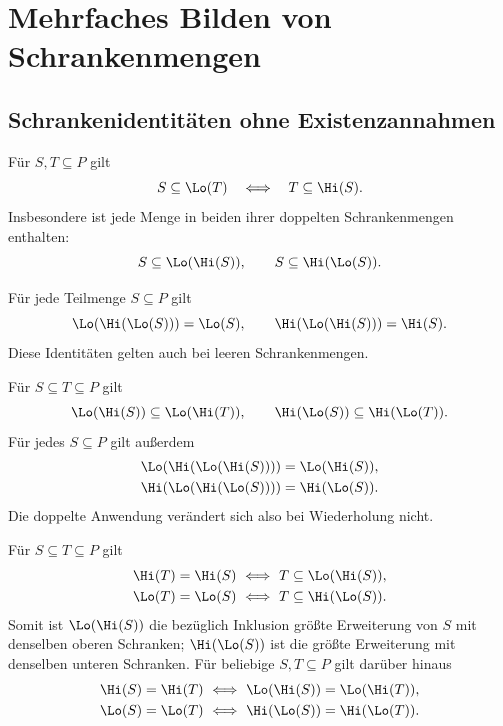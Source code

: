 \chapter{Mehrfaches Bilden von Schrankenmengen}
\label{b13guide:ch:iteration}

\section{Schrankenidentitäten ohne Existenzannahmen}

\begin{theorem}
\label{b13guide:thm:polarity}
Für $S,T\subseteq P$ gilt
\[
 S\subseteq\Lo(T)\quad\Longleftrightarrow\quad T\subseteq\Hi(S).
\]
Insbesondere ist jede Menge in beiden ihrer doppelten
Schrankenmengen enthalten:
\[
 S\subseteq\Lo(\Hi(S)),\qquad S\subseteq\Hi(\Lo(S)).
\]
\end{theorem}

\begin{theorem}
\label{b13guide:thm:triple}
Für jede Teilmenge $S\subseteq P$ gilt
\[
 \Lo(\Hi(\Lo(S)))=\Lo(S),\qquad
 \Hi(\Lo(\Hi(S)))=\Hi(S).
\]
Diese Identitäten gelten auch bei leeren Schrankenmengen.
\end{theorem}

\begin{theorem}
\label{b13guide:thm:double}
Für $S\subseteq T\subseteq P$ gilt
\[
 \Lo(\Hi(S))\subseteq\Lo(\Hi(T)),\qquad
 \Hi(\Lo(S))\subseteq\Hi(\Lo(T)).
\]
Für jedes $S\subseteq P$ gilt außerdem
\[
\begin{aligned}
 \Lo(\Hi(\Lo(\Hi(S))))&=\Lo(\Hi(S)),\\
 \Hi(\Lo(\Hi(\Lo(S))))&=\Hi(\Lo(S)).
\end{aligned}
\]
Die doppelte Anwendung verändert sich also bei Wiederholung nicht.
\end{theorem}

\begin{theorem}
\label{b13guide:thm:largest-extension}
Für $S\subseteq T\subseteq P$ gilt
\[
\begin{aligned}
 \Hi(T)=\Hi(S)&\ \Longleftrightarrow\ T\subseteq\Lo(\Hi(S)),\\
 \Lo(T)=\Lo(S)&\ \Longleftrightarrow\ T\subseteq\Hi(\Lo(S)).
\end{aligned}
\]
Somit ist $\Lo(\Hi(S))$ die bezüglich Inklusion größte Erweiterung
von $S$ mit denselben oberen Schranken; $\Hi(\Lo(S))$ ist die
größte Erweiterung mit denselben unteren Schranken.
Für beliebige $S,T\subseteq P$ gilt darüber hinaus
\[
\begin{aligned}
 \Hi(S)=\Hi(T)&\ \Longleftrightarrow\ \Lo(\Hi(S))=\Lo(\Hi(T)),\\
 \Lo(S)=\Lo(T)&\ \Longleftrightarrow\ \Hi(\Lo(S))=\Hi(\Lo(T)).
\end{aligned}
\]
\end{theorem}


